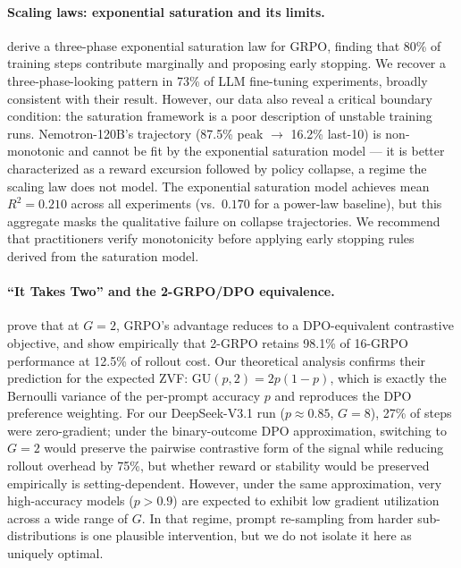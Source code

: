 \documentclass{article}
\begin{document}
\paragraph{Scaling laws: exponential saturation and its limits.}
\citet{nimmaturi2025scalinglaws} derive a three-phase exponential saturation
law for GRPO, finding that 80\% of training steps contribute marginally and
proposing early stopping.
We recover a three-phase-looking pattern in 73\% of LLM fine-tuning
experiments, broadly consistent with their result.
However, our data also reveal a critical boundary condition: the saturation
framework is a poor description of unstable training runs.
Nemotron-120B's trajectory (87.5\% peak $\to$ 16.2\% last-10) is
non-monotonic and cannot be fit by the exponential saturation model ---
it is better characterized as a reward excursion followed by policy
collapse, a regime the scaling law does not model.
The exponential saturation model achieves mean $R^{2} = 0.210$ across all
experiments (vs.\ $0.170$ for a power-law baseline), but this aggregate
masks the qualitative failure on collapse trajectories.
We recommend that practitioners verify monotonicity before applying early
stopping rules derived from the saturation model.

\paragraph{``It Takes Two'' and the 2-GRPO/DPO equivalence.}
\citet{wu2025grpo_dpo} prove that at $G = 2$, GRPO's advantage reduces to a
DPO-equivalent contrastive objective, and show empirically that 2-GRPO retains
98.1\% of 16-GRPO performance at 12.5\% of rollout cost.
Our theoretical analysis confirms their prediction for the expected ZVF:
$\mathrm{GU}(p, 2) = 2p(1-p)$, which is exactly the Bernoulli variance of
the per-prompt accuracy $p$ and reproduces the DPO preference weighting.
For our DeepSeek-V3.1 run ($p \approx 0.85$, $G = 8$), 27\% of steps were
zero-gradient; under the binary-outcome DPO approximation, switching to
$G = 2$ would preserve the pairwise contrastive form of the signal while
reducing rollout overhead by 75\%, but whether reward or stability would be
preserved empirically is setting-dependent.
However, under the same approximation, very high-accuracy models
($p > 0.9$) are expected to exhibit low gradient utilization across a wide
range of $G$. In that regime, prompt re-sampling from harder
sub-distributions is one plausible intervention, but we do not isolate it
here as uniquely optimal.
\end{document}
